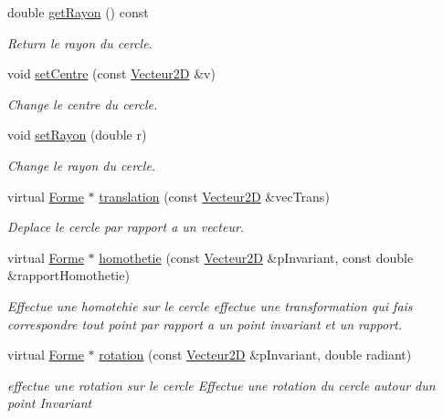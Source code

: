 \begin{DoxyCompactItemize}
\mbox{\label{class_cercle_abc1c953fd5ef431158e89dc8344b1de1}} 
double \mbox{\hyperlink{class_cercle_abc1c953fd5ef431158e89dc8344b1de1}{get\+Rayon}} () const
\begin{DoxyCompactList}\small\item\em Return le rayon du cercle. \end{DoxyCompactList}\item 
void \mbox{\hyperlink{class_cercle_aa445da0cb6b4aa420b4b6e128a432f41}{set\+Centre}} (const \mbox{\hyperlink{class_vecteur2_d}{Vecteur2D}} \&v)
\begin{DoxyCompactList}\small\item\em Change le centre du cercle. \end{DoxyCompactList}\item 
void \mbox{\hyperlink{class_cercle_a41a16acfa3c2ddeb029c117ca3c2fd34}{set\+Rayon}} (double r)
\begin{DoxyCompactList}\small\item\em Change le rayon du cercle. \end{DoxyCompactList}\item 
virtual \mbox{\hyperlink{class_forme}{Forme}} $\ast$ \mbox{\hyperlink{class_cercle_a5ba23911b0cc2601c06e7397d409406d}{translation}} (const \mbox{\hyperlink{class_vecteur2_d}{Vecteur2D}} \&vec\+Trans)
\begin{DoxyCompactList}\small\item\em Deplace le cercle par rapport a un vecteur. \end{DoxyCompactList}\item 
virtual \mbox{\hyperlink{class_forme}{Forme}} $\ast$ \mbox{\hyperlink{class_cercle_a75b80b076c0f27a52a326213a4d92349}{homothetie}} (const \mbox{\hyperlink{class_vecteur2_d}{Vecteur2D}} \&p\+Invariant, const double \&rapport\+Homothetie)
\begin{DoxyCompactList}\small\item\em Effectue une homotehie sur le cercle effectue une transformation qui fais correspondre tout point par rapport a un point invariant et un rapport. \end{DoxyCompactList}\item 
virtual \mbox{\hyperlink{class_forme}{Forme}} $\ast$ \mbox{\hyperlink{class_cercle_af9e9abb354ac250e94d42dd46ef6eafa}{rotation}} (const \mbox{\hyperlink{class_vecteur2_d}{Vecteur2D}} \&p\+Invariant, double radiant)
\begin{DoxyCompactList}\small\item\em effectue une rotation sur le cercle Effectue une rotation du cercle autour d\textquotesingle{}un point Invariant \end{DoxyCompactList}\item 

\end{DoxyCompactItemize}
